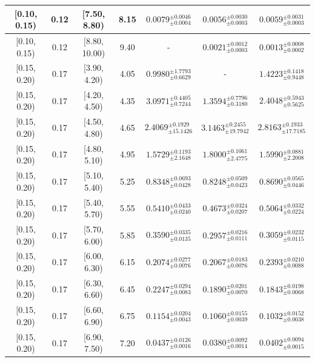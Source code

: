 \begin{longtable}{|c|c|c|c|c|c|c|}
\hline
[0.10, 0.15) & 0.12 & [7.50, 8.80) & 8.15 & $0.0079^{ \pm 0.0046 }_{ \pm 0.0004 }$ & $0.0056^{ \pm 0.0030 }_{ \pm 0.0003 }$ & $0.0059^{ \pm 0.0031 }_{ \pm 0.0003 }$ \\ 
\hline
[0.10, 0.15) & 0.12 & [8.80, 10.00) & 9.40 & - & $0.0021^{ \pm 0.0012 }_{ \pm 0.0003 }$ & $0.0013^{ \pm 0.0008 }_{ \pm 0.0002 }$ \\ 
\hline
[0.15, 0.20) & 0.17 & [3.90, 4.20) & 4.05 & $0.9980^{ \pm 1.7793 }_{ \pm 0.6629 }$ & - & $1.4223^{ \pm 0.1418 }_{ \pm 0.9448 }$ \\ 
\hline
[0.15, 0.20) & 0.17 & [4.20, 4.50) & 4.35 & $3.0971^{ \pm 0.4405 }_{ \pm 0.7244 }$ & $1.3594^{ \pm 0.7796 }_{ \pm 0.3180 }$ & $2.4048^{ \pm 0.5943 }_{ \pm 0.5625 }$ \\ 
\hline
[0.15, 0.20) & 0.17 & [4.50, 4.80) & 4.65 & $2.4069^{ \pm 0.1929 }_{ \pm 15.1426 }$ & $3.1463^{ \pm 0.2455 }_{ \pm 19.7942 }$ & $2.8163^{ \pm 0.1933 }_{ \pm 17.7185 }$ \\ 
\hline
[0.15, 0.20) & 0.17 & [4.80, 5.10) & 4.95 & $1.5729^{ \pm 0.1193 }_{ \pm 2.1648 }$ & $1.8000^{ \pm 0.1061 }_{ \pm 2.4775 }$ & $1.5990^{ \pm 0.0881 }_{ \pm 2.2008 }$ \\ 
\hline
[0.15, 0.20) & 0.17 & [5.10, 5.40) & 5.25 & $0.8348^{ \pm 0.0693 }_{ \pm 0.0428 }$ & $0.8248^{ \pm 0.0509 }_{ \pm 0.0423 }$ & $0.8690^{ \pm 0.0565 }_{ \pm 0.0446 }$ \\ 
\hline
[0.15, 0.20) & 0.17 & [5.40, 5.70) & 5.55 & $0.5410^{ \pm 0.0433 }_{ \pm 0.0240 }$ & $0.4673^{ \pm 0.0324 }_{ \pm 0.0207 }$ & $0.5064^{ \pm 0.0332 }_{ \pm 0.0224 }$ \\ 
\hline
[0.15, 0.20) & 0.17 & [5.70, 6.00) & 5.85 & $0.3590^{ \pm 0.0335 }_{ \pm 0.0135 }$ & $0.2957^{ \pm 0.0216 }_{ \pm 0.0111 }$ & $0.3059^{ \pm 0.0232 }_{ \pm 0.0115 }$ \\ 
\hline
[0.15, 0.20) & 0.17 & [6.00, 6.30) & 6.15 & $0.2074^{ \pm 0.0277 }_{ \pm 0.0076 }$ & $0.2067^{ \pm 0.0183 }_{ \pm 0.0076 }$ & $0.2393^{ \pm 0.0210 }_{ \pm 0.0088 }$ \\ 
\hline
[0.15, 0.20) & 0.17 & [6.30, 6.60) & 6.45 & $0.2247^{ \pm 0.0294 }_{ \pm 0.0083 }$ & $0.1890^{ \pm 0.0201 }_{ \pm 0.0070 }$ & $0.1843^{ \pm 0.0198 }_{ \pm 0.0068 }$ \\ 
\hline
[0.15, 0.20) & 0.17 & [6.60, 6.90) & 6.75 & $0.1154^{ \pm 0.0204 }_{ \pm 0.0043 }$ & $0.1060^{ \pm 0.0155 }_{ \pm 0.0039 }$ & $0.1032^{ \pm 0.0152 }_{ \pm 0.0038 }$ \\ 
\hline
[0.15, 0.20) & 0.17 & [6.90, 7.50) & 7.20 & $0.0437^{ \pm 0.0126 }_{ \pm 0.0016 }$ & $0.0380^{ \pm 0.0092 }_{ \pm 0.0014 }$ & $0.0402^{ \pm 0.0094 }_{ \pm 0.0015 }$ \\ 

\end{longtable}
